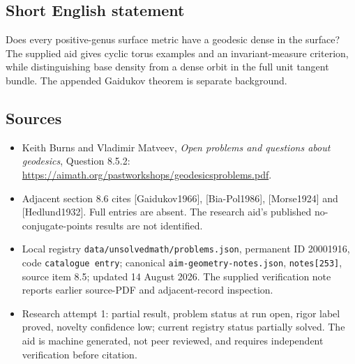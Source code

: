 \documentclass[11pt]{article}
\begin{document}
\subsection{Short English statement}
Does every positive-genus surface metric have a geodesic dense in the surface? The supplied aid gives cyclic torus examples and an invariant-measure criterion, while distinguishing base density from a dense orbit in the full unit tangent bundle. The appended Gaidukov theorem is separate background.
\subsection{Sources}
\begin{itemize}
\item Keith Burns and Vladimir Matveev, \emph{Open problems and questions about geodesics}, Question 8.5.2: \url{https://aimath.org/pastworkshops/geodesicsproblems.pdf}.
\item Adjacent section 8.6 cites [Gaidukov1966], [Bia-Pol1986], [Morse1924] and [Hedlund1932]. Full entries are absent. The research aid's published no-conjugate-points results are not identified.
\item Local registry \texttt{data/unsolvedmath/problems.json}, permanent ID 20001916, code \texttt{catalogue entry}; canonical \texttt{aim-geometry-notes.json}, \texttt{notes[253]}, source item 8.5; updated 14 August 2026. The supplied verification note reports earlier source-PDF and adjacent-record inspection.
\item Research attempt 1: partial result, problem status at run open, rigor label proved, novelty confidence low; current registry status partially solved. The aid is machine generated, not peer reviewed, and requires independent verification before citation.
\end{itemize}
\end{document}
